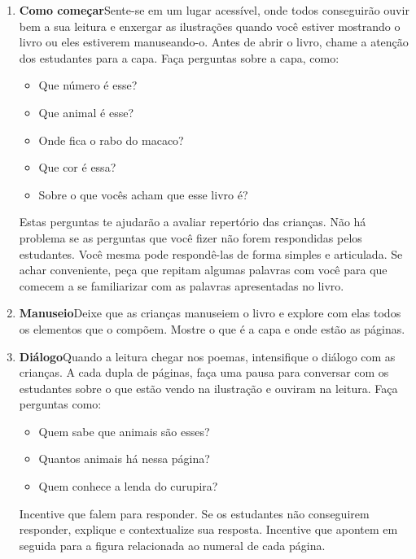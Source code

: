 \documentclass[11pt]{extarticle}
\begin{document}
\begin{enumerate}
\item \textbf{Como começar}\quad Sente-se em um lugar acessível, 
onde todos conseguirão ouvir bem a sua leitura e enxergar as ilustrações 
quando você estiver mostrando o livro ou eles estiverem manuseando-o. 
Antes de abrir o livro, chame a atenção dos estudantes para a capa. 
Faça perguntas sobre a capa, como: 

\begin{itemize}
\item Que número é esse?
\item Que animal é esse?
\item Onde fica o rabo do macaco?
\item Que cor é essa?
\item Sobre o que vocês acham que esse livro é?
\end{itemize}

Estas perguntas te ajudarão a avaliar repertório das crianças. 
Não há problema se as perguntas que você fizer não forem respondidas pelos 
estudantes. Você mesma pode respondê-las de forma simples e articulada. Se achar 
conveniente, peça que repitam algumas palavras com você para que comecem a se familiarizar com as palavras apresentadas no livro. 
 
\item \textbf{Manuseio}\quad Deixe que as crianças manuseiem o livro 
e explore com elas todos os elementos que o compõem. Mostre o que é a 
capa e onde estão as páginas.

\item \textbf{Diálogo}\quad Quando a leitura chegar nos poemas, 
intensifique o diálogo com as crianças. A cada dupla de páginas, faça uma 
pausa para conversar com os estudantes sobre o que estão vendo na ilustração e ouviram na leitura. 
Faça perguntas como: 

\begin{itemize}
\item Quem sabe que animais são esses?
\item Quantos animais há nessa página?
\item Quem conhece a lenda do curupira?
\end{itemize}

Incentive que falem para responder. Se os estudantes não 
conseguirem responder, explique e contextualize sua
resposta. Incentive que apontem em seguida para a figura relacionada ao numeral de cada página. 


\end{enumerate}
\end{document}
